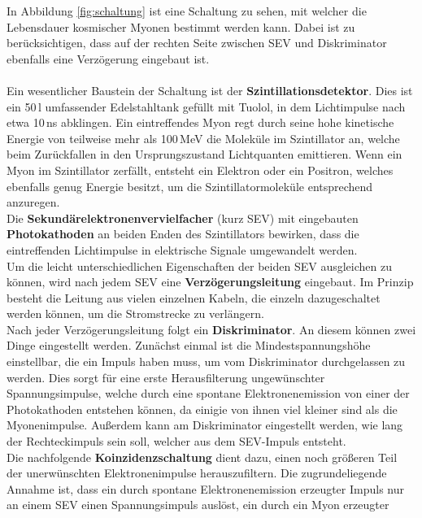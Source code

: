     In Abbildung \ref{fig:schaltung} ist eine Schaltung zu sehen,
    mit welcher die Lebensdauer kosmischer Myonen bestimmt werden kann.
    Dabei ist zu berücksichtigen, dass auf der rechten Seite
    zwischen SEV und Diskriminator ebenfalls eine Verzögerung eingebaut ist.\\
    \ \\
    Ein wesentlicher Baustein der Schaltung ist der \textbf{Szintillationsdetektor}.
    Dies ist ein 50\,l umfassender Edelstahltank gefüllt mit Tuolol,
    in dem Lichtimpulse nach etwa 10\,ns abklingen.
    Ein eintreffendes Myon regt durch seine hohe kinetische Energie von
    teilweise mehr als 100\,MeV die Moleküle im Szintillator an, welche
    beim Zurückfallen in den Ursprungszustand Lichtquanten emittieren.
    Wenn ein Myon im Szintillator zerfällt, entsteht ein Elektron oder ein
    Positron, welches ebenfalls genug Energie besitzt, um die Szintillatormoleküle
    entsprechend anzuregen. \\
    Die \textbf{Sekundärelektronenvervielfacher} (kurz SEV) mit eingebauten
    \textbf{Photokathoden} an beiden Enden des Szintillators bewirken,
    dass die eintreffenden Lichtimpulse in elektrische Signale umgewandelt
    werden.\\
    Um die leicht unterschiedlichen Eigenschaften der beiden SEV ausgleichen
    zu können, wird nach jedem SEV eine \textbf{Verzögerungsleitung} eingebaut.
    Im Prinzip besteht die Leitung aus vielen einzelnen Kabeln, die einzeln dazugeschaltet
    werden können, um die Stromstrecke zu verlängern. \\
    Nach jeder Verzögerungsleitung folgt ein \textbf{Diskriminator}. An diesem können zwei
    Dinge eingestellt werden. Zunächst einmal ist die Mindestspannungshöhe
    einstellbar, die ein Impuls haben muss, um vom Diskriminator
    durchgelassen zu werden. Dies sorgt für eine erste Herausfilterung
    ungewünschter Spannungsimpulse, welche durch eine spontane Elektronenemission
    von einer der Photokathoden entstehen können, da einigie von ihnen viel kleiner
    sind als die Myonenimpulse. Außerdem kann am Diskriminator
    eingestellt werden, wie lang der Rechteckimpuls sein
    soll, welcher aus dem SEV-Impuls entsteht.\\
    Die nachfolgende \textbf{Koinzidenzschaltung} dient dazu, einen noch größeren Teil
    der unerwünschten Elektronenimpulse herauszufiltern. Die zugrundeliegende
    Annahme ist, dass ein durch spontane Elektronenemission erzeugter Impuls
    nur an einem SEV einen Spannungsimpuls auslöst, ein durch ein Myon erzeugter
